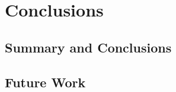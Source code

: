 
\chapter{Conclusions}
\label{ch:conc}


\section{Summary and Conclusions}
\label{sec:summary}


\section{Future Work}
\label{sec:future}


\endinput
Any text after an \endinput is ignored.
You could put scraps here or things in progress.
